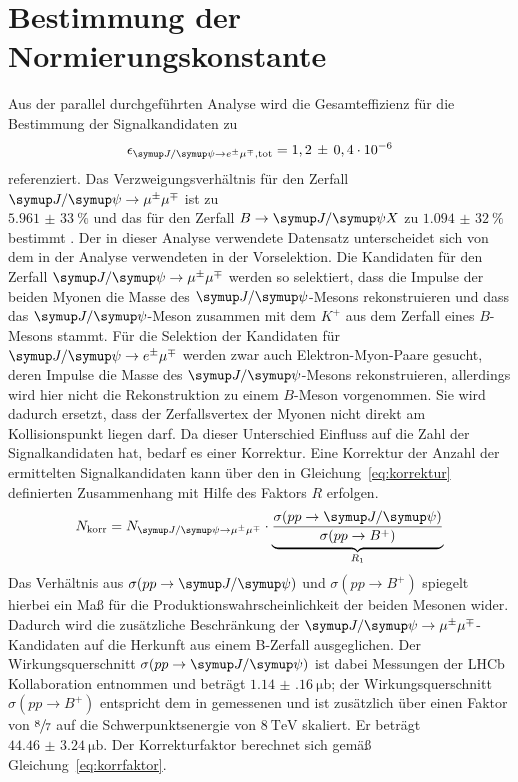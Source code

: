 \section{Bestimmung der Normierungskonstante}
\label{sec:norm}
Aus der parallel durchgeführten Analyse \cite{ba-maik} wird die Gesamteffizienz für die Bestimmung der Signalkandidaten zu
%
\begin{equation}
  \epsilon_{\signal, \text{tot}}=1,2\,\pm\,0,4\cdot 10^{-6}
\end{equation}
%
referenziert. Das Verzweigungsverhältnis für den Zerfall $\kontroll$ ist zu \\$\SI{5,961(33)}{\percent}$ und das für den Zerfall $B\rightarrow\jpsi X$ zu $\SI{1,094(32)}{\percent}$ bestimmt \cite{pdg}. Der in
dieser Analyse verwendete Datensatz unterscheidet sich von dem in der Analyse \cite{ba-maik} verwendeten in der Vorselektion. Die
Kandidaten für den Zerfall $\kontroll$ werden so selektiert, dass die Impulse der beiden Myonen die Masse des $\jpsi$-Mesons
rekonstruieren und dass das $\jpsi$-Meson zusammen mit dem $K^+$ aus dem Zerfall eines $B$-Mesons stammt. Für die Selektion der Kandidaten für $\signal$ werden zwar auch Elektron-Myon-Paare gesucht, deren Impulse die Masse des $\jpsi$-Mesons rekonstruieren, allerdings wird
hier nicht die Rekonstruktion zu einem $B$-Meson vorgenommen. Sie wird dadurch ersetzt, dass der Zerfallsvertex der Myonen nicht direkt
am Kollisionspunkt liegen darf. Da dieser Unterschied Einfluss auf die Zahl der Signalkandidaten hat, bedarf es einer Korrektur. Eine Korrektur der Anzahl der ermittelten Signalkandidaten kann über den in Gleichung~\eqref{eq:korrektur} definierten Zusammenhang mit Hilfe des Faktors $R$ erfolgen.
%
\begin{equation}
  N_\text{korr}=N_{\kontroll}\cdot\underbrace{\frac{\sigma(pp\rightarrow\jpsi)}{\sigma(pp\rightarrow B^+)}}_{R_1}
  \label{eq:korrektur}
\end{equation}
%
Das Verhältnis aus $\sigma(pp\rightarrow\jpsi)$ und $\sigma(pp\rightarrow B^+)$ spiegelt hierbei ein Maß für die
Produktionswahrscheinlichkeit der beiden Mesonen wider. Dadurch wird die zusätzliche Beschränkung der $\kontroll$-Kandidaten auf die Herkunft aus einem B-Zerfall ausgeglichen. Der Wirkungsquerschnitt $\sigma(pp\rightarrow\jpsi)$ ist dabei Messungen der LHCb Kollaboration entnommen \cite{sigmajpsi} und beträgt $\SI{1.14(16)}{\micro\barn}$; der Wirkungsquerschnitt $\sigma(pp\rightarrow B^+)$ entspricht dem in \cite{sigmaB} gemessenen und ist zusätzlich über einen Faktor von $\sfrac{8}{7}$ auf die Schwerpunktsenergie von $\SI{8}{\tera\electronvolt}$ skaliert. Er beträgt $\SI{44.46(324)}{\micro\barn}$. Der Korrekturfaktor berechnet sich gemäß Gleichung~\eqref{eq:korrfaktor}.
